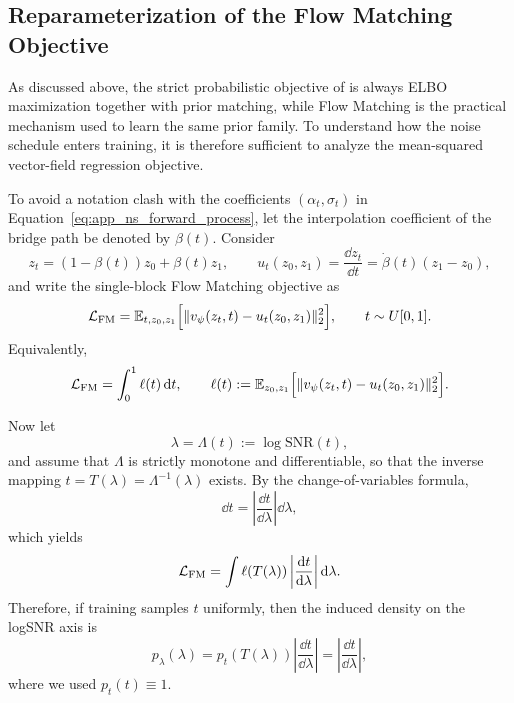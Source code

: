 \subsection{Reparameterization of the Flow Matching Objective}
\label{app:flow_matching_reparam}

As discussed above, the strict probabilistic objective of \method is always ELBO maximization together with prior matching, while Flow Matching is the practical mechanism used to learn the same prior family. To understand how the noise schedule enters training, it is therefore sufficient to analyze the mean-squared vector-field regression objective.

To avoid a notation clash with the coefficients $(\alpha_t,\sigma_t)$ in Equation~\eqref{eq:app_ns_forward_process}, let the interpolation coefficient of the bridge path be denoted by $\beta(t)$. Consider
\begin{equation}
z_t=(1-\beta(t))z_0+\beta(t)z_1,
\qquad
u_t(z_0,z_1)=\frac{\dd z_t}{\dd t}=\dot\beta(t)(z_1-z_0),
\label{eq:app_bridge_path_beta}
\end{equation}
and write the single-block Flow Matching objective as
\begin{equation}
\mathcal{L}_{\mathrm{FM}}
=
\mathbb{E}_{t,z_0,z_1}
\Big[
\|v_{\psi}(z_t,t)-u_t(z_0,z_1)\|_2^2
\Big],
\qquad
t\sim U[0,1].
\label{eq:app_fm_loss_single_block}
\end{equation}
Equivalently,
\begin{equation}
\mathcal{L}_{\mathrm{FM}}
=
\int_0^1 \ell(t)\,\mathrm{d} t,
\qquad
\ell(t):=
\mathbb{E}_{z_0,z_1}
\Big[
\|v_{\psi}(z_t,t)-u_t(z_0,z_1)\|_2^2
\Big].
\label{eq:app_fm_loss_integral_t}
\end{equation}

Now let
\begin{equation}
\lambda=\Lambda(t):=\log \mathrm{SNR}(t),
\label{eq:app_lambda_as_reparam}
\end{equation}
and assume that $\Lambda$ is strictly monotone and differentiable, so that the inverse mapping $t=T(\lambda)=\Lambda^{-1}(\lambda)$ exists. By the change-of-variables formula,
\begin{equation}
\dd t=\left|\frac{\dd t}{\dd \lambda}\right|\dd \lambda,
\label{eq:app_dt_dlambda}
\end{equation}
which yields
\begin{equation}
\mathcal{L}_{\mathrm{FM}}
=
\int
\ell(T(\lambda))
\left|\frac{\mathrm{d} t}{\mathrm{d} \lambda}\right|
\mathrm{d} \lambda.
\label{eq:app_fm_loss_integral_lambda_first}
\end{equation}
Therefore, if training samples $t$ uniformly, then the induced density on the logSNR axis is
\begin{equation}
p_{\lambda}(\lambda)
=
p_t(T(\lambda))
\left|\frac{\dd t}{\dd \lambda}\right|
=
\left|\frac{\dd t}{\dd \lambda}\right|,
\label{eq:app_induced_density_lambda}
\end{equation}
where we used $p_t(t)\equiv 1$.

